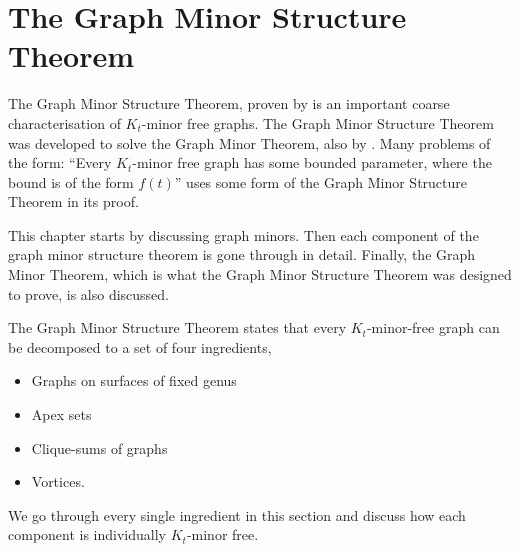 \chapter{The Graph Minor Structure Theorem}\label{chap:gmst}

The Graph Minor Structure Theorem, proven by \textcite{robertsonGraphMinorsXVI2003} is an important coarse characterisation of $K_t$-minor free graphs. The Graph Minor Structure Theorem was developed to solve the Graph Minor Theorem, also by \textcite{robertsonGraphMinorsXX2004}. Many problems of the form: ``Every $K_t$-minor free graph has some bounded parameter, where the bound is of the form $f(t)$'' uses some form of the Graph Minor Structure Theorem in its proof. 


This chapter starts by discussing graph minors. Then each component of the graph minor structure theorem is gone through in detail. Finally, the Graph Minor Theorem, which is what the Graph Minor Structure Theorem was designed to prove, is also discussed.

The Graph Minor Structure Theorem states that every $K_t$-minor-free graph can be decomposed to a set of four ingredients, 
\begin{itemize}
	\item Graphs on surfaces of fixed genus
	\item Apex sets
	\item Clique-sums of graphs
	\item Vortices.
\end{itemize}
We go through every single ingredient in this section and discuss how each component is individually $K_t$-minor free. 














